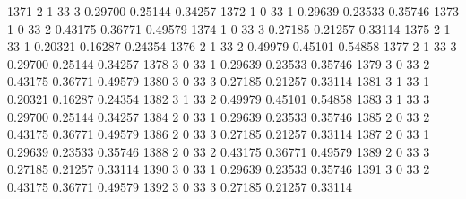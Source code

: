 \documentclass{article}
\begin{document}
\begin{Woutput}
1371      2       1      33       3       0.29700    0.25144    0.34257
1372      1       0      33       1       0.29639    0.23533    0.35746
1373      1       0      33       2       0.43175    0.36771    0.49579
1374      1       0      33       3       0.27185    0.21257    0.33114
1375      2       1      33       1       0.20321    0.16287    0.24354
1376      2       1      33       2       0.49979    0.45101    0.54858
1377      2       1      33       3       0.29700    0.25144    0.34257
1378      3       0      33       1       0.29639    0.23533    0.35746
1379      3       0      33       2       0.43175    0.36771    0.49579
1380      3       0      33       3       0.27185    0.21257    0.33114
1381      3       1      33       1       0.20321    0.16287    0.24354
1382      3       1      33       2       0.49979    0.45101    0.54858
1383      3       1      33       3       0.29700    0.25144    0.34257
1384      2       0      33       1       0.29639    0.23533    0.35746
1385      2       0      33       2       0.43175    0.36771    0.49579
1386      2       0      33       3       0.27185    0.21257    0.33114
1387      2       0      33       1       0.29639    0.23533    0.35746
1388      2       0      33       2       0.43175    0.36771    0.49579
1389      2       0      33       3       0.27185    0.21257    0.33114
1390      3       0      33       1       0.29639    0.23533    0.35746
1391      3       0      33       2       0.43175    0.36771    0.49579
1392      3       0      33       3       0.27185    0.21257    0.33114


\end{Woutput}
\end{document}
